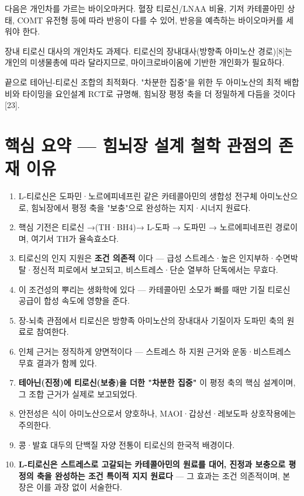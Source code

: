 \documentclass[12pt,oneside]{book}
\begin{document}
다음은 개인차를 가르는 바이오마커다. 혈장 티로신/LNAA 비율, 기저 카테콜아민 상태, COMT 유전형 등에 따라 반응이 다를 수 있어, 반응을 예측하는 바이오마커를 세워야 한다.

장내 티로신 대사의 개인차도 과제다. 티로신의 장내대사(방향족 아미노산 경로)[8]는 개인의 미생물총에 따라 달라지므로, 마이크로바이옴에 기반한 개인화가 필요하다.

끝으로 테아닌-티로신 조합의 최적화다. "차분한 집중"을 위한 두 아미노산의 최적 배합비와 타이밍을 요인설계 RCT로 규명해, 힘뇌장 평정 축을 더 정밀하게 다듬을 것이다[23].

\section{핵심 요약 — 힘뇌장 설계 철학 관점의 존재 이유}

\begin{enumerate}[leftmargin=6mm,itemsep=1pt,topsep=2pt]
  \item L-티로신은 도파민·노르에피네프린 같은 카테콜아민의 생합성 전구체 아미노산으로, 힘뇌장에서 평정 축을 "보충"으로 완성하는 지지·시너지 원료다.
  \item 핵심 기전은 티로신 →(TH·BH4)→ L-도파 → 도파민 → 노르에피네프린 경로이며, 여기서 TH가 율속효소다.
  \item 티로신의 인지 지원은 \textbf{조건 의존적} 이다 — 급성 스트레스·높은 인지부하·수면박탈·정신적 피로에서 보고되고, 비스트레스·단순 열부하 단독에서는 무효다.
  \item 이 조건성의 뿌리는 생화학에 있다 — 카테콜아민 소모가 빠를 때만 기질 티로신 공급이 합성 속도에 영향을 준다.
  \item 장-뇌축 관점에서 티로신은 방향족 아미노산의 장내대사 기질이자 도파민 축의 원료로 참여한다.
  \item 인체 근거는 정직하게 양면적이다 — 스트레스 하 지원 근거와 운동·비스트레스 무효 결과가 함께 있다.
  \item \textbf{테아닌(진정)에 티로신(보충)을 더한 "차분한 집중"} 이 평정 축의 핵심 설계이며, 그 조합 근거가 실제로 보고되었다.
  \item 안전성은 식이 아미노산으로서 양호하나, MAOI·갑상선·레보도파 상호작용에는 주의한다.
  \item 콩·발효 대두의 단백질 자양 전통이 티로신의 한국적 배경이다.
  \item \textbf{L-티로신은 스트레스로 고갈되는 카테콜아민의 원료를 대어, 진정과 보충으로 평정의 축을 완성하는 조건 특이적 지지 원료다} — 그 효과는 조건 의존적이며, 본 장은 이를 과장 없이 서술한다.
\end{enumerate}
\end{document}
